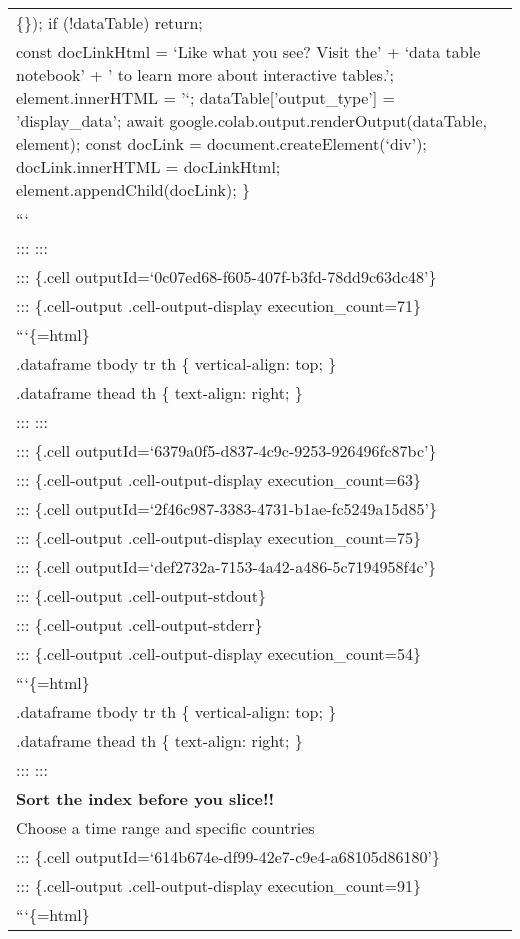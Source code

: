 \documentclass[
  letterpaper,
  DIV=11,
  numbers=noendperiod]{scrreprt}
\begin{document}
\begin{longtable}[]{@{}
  >{\raggedright\arraybackslash}p{}@{}}
\{\}); if (!dataTable) return; \\
const docLinkHtml = `Like what you see? Visit the' + `data table
notebook' + ' to learn more about interactive tables.';
element.innerHTML = '`; dataTable{[}'output\_type'{]} = 'display\_data';
await google.colab.output.renderOutput(dataTable, element); const
docLink = document.createElement(`div'); docLink.innerHTML =
docLinkHtml; element.appendChild(docLink); \}  \\
``` \\
::: ::: \\
::: \{.cell outputId=`0c07ed68-f605-407f-b3fd-78dd9c63dc48'\} \\
::: \{.cell-output .cell-output-display execution\_count=71\} \\
```\{=html\} \\
.dataframe tbody tr th \{ vertical-align: top; \} \\
.dataframe thead th \{ text-align: right; \} \\
::: ::: \\
::: \{.cell outputId=`6379a0f5-d837-4c9c-9253-926496fc87bc'\} \\
::: \{.cell-output .cell-output-display execution\_count=63\} \\
::: \{.cell outputId=`2f46c987-3383-4731-b1ae-fc5249a15d85'\} \\
::: \{.cell-output .cell-output-display execution\_count=75\} \\
::: \{.cell outputId=`def2732a-7153-4a42-a486-5c7194958f4c'\} \\
::: \{.cell-output .cell-output-stdout\} \\
::: \{.cell-output .cell-output-stderr\} \\
::: \{.cell-output .cell-output-display execution\_count=54\} \\
```\{=html\} \\
.dataframe tbody tr th \{ vertical-align: top; \} \\
.dataframe thead th \{ text-align: right; \} \\
::: ::: \\
\textbf{Sort the index before you slice!!} \\
Choose a time range and specific countries \\
::: \{.cell outputId=`614b674e-df99-42e7-c9e4-a68105d86180'\} \\
::: \{.cell-output .cell-output-display execution\_count=91\} \\
```\{=html\} \\

\end{longtable}
\end{document}
